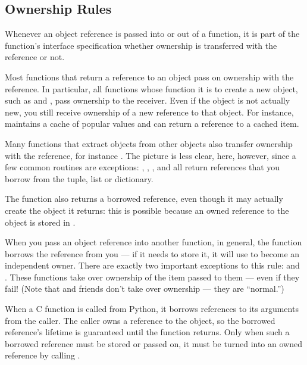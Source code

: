 \subsection{Ownership Rules
            \label{ownershipRules}}

Whenever an object reference is passed into or out of a function, it
is part of the function's interface specification whether ownership is
transferred with the reference or not.

Most functions that return a reference to an object pass on ownership
with the reference.  In particular, all functions whose function it is
to create a new object, such as  and
, pass ownership to the receiver.  Even if
the object is not actually new, you still receive ownership of a new
reference to that object.  For instance, 
maintains a cache of popular values and can return a reference to a
cached item.

Many functions that extract objects from other objects also transfer
ownership with the reference, for instance
.  The picture is less clear, here,
however, since a few common routines are exceptions:
, ,
, and 
all return references that you borrow from the tuple, list or
dictionary.

The function  also returns a borrowed
reference, even though it may actually create the object it returns:
this is possible because an owned reference to the object is stored in
.

When you pass an object reference into another function, in general,
the function borrows the reference from you --- if it needs to store
it, it will use  to become an independent
owner.  There are exactly two important exceptions to this rule:
 and .  These
functions take over ownership of the item passed to them --- even if
they fail!  (Note that  and friends don't
take over ownership --- they are ``normal.'')

When a C function is called from Python, it borrows references to its
arguments from the caller.  The caller owns a reference to the object,
so the borrowed reference's lifetime is guaranteed until the function
returns.  Only when such a borrowed reference must be stored or passed
on, it must be turned into an owned reference by calling
.

